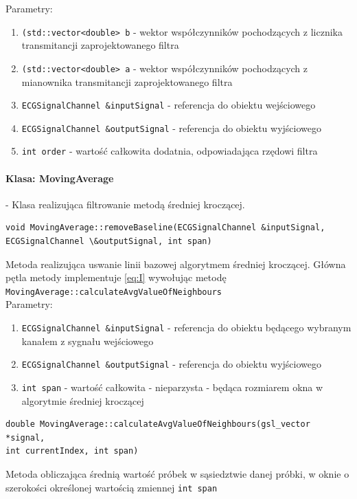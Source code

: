 \documentclass[a4paper, 11pt]{article}
\begin{document}
Parametry:
\begin{enumerate}
\item \verb|(std::vector<double> b| - wektor współczynników pochodzących z licznika transmitancji zaprojektowanego filtra
\item \verb|(std::vector<double> a| - wektor współczynników pochodzących z mianownika transmitancji zaprojektowanego filtra
\item \verb|ECGSignalChannel &inputSignal| - referencja do obiektu wejściowego
\item \verb|ECGSignalChannel &outputSignal| - referencja do obiektu wyjściowego
\item \verb|int order| - wartość całkowita dodatnia, odpowiadająca rzędowi filtra
\end{enumerate}

\paragraph{Klasa: MovingAverage}
- Klasa realizująca filtrowanie metodą średniej kroczącej.

\begin{lstlisting}
void MovingAverage::removeBaseline(ECGSignalChannel &inputSignal, 
ECGSignalChannel \&outputSignal, int span)
\end{lstlisting}
Metoda realizująca uswanie linii bazowej algorytmem średniej kroczącej. Główna pętla metody implementuje \eqref{eq:I} wywołując metodę \verb|MovingAverage::calculateAvgValueOfNeighbours|\\

Parametry:
\begin{enumerate}
\item \verb|ECGSignalChannel &inputSignal| - referencja do obiektu będącego wybranym kanałem z sygnału wejściowego
\item \verb|ECGSignalChannel &outputSignal| - referencja do obiektu wyjściowego
\item \verb|int span| - wartość całkowita - nieparzysta - będąca rozmiarem okna w algorytmie średniej kroczącej
\end{enumerate}

\begin{lstlisting}
double MovingAverage::calculateAvgValueOfNeighbours(gsl_vector *signal, 
int currentIndex, int span)
\end{lstlisting}
Metoda obliczająca średnią wartość próbek w sąsiedztwie danej próbki, w oknie o szerokości określonej wartością zmiennej \verb|int span|\\
\end{document}
